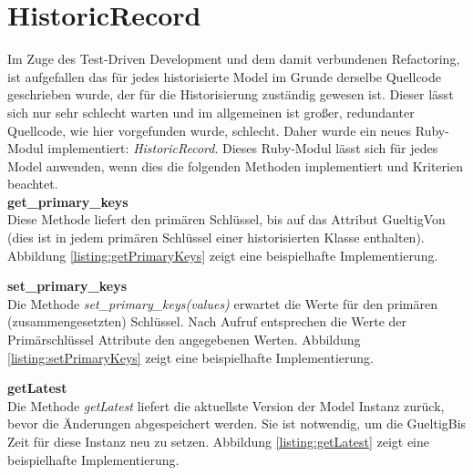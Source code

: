 \documentclass[12pt,             %
               a4paper,          %
               listof=totoc,     %
               index=totoc,      %
               bibliography=totoc,%
               oneside,         %
               BCOR1cm,          %
               english   %
               ]{scrbook}
\begin{document}
\section{HistoricRecord}
Im Zuge des Test-Driven Development und dem damit verbundenen Refactoring, ist aufgefallen das für jedes historisierte Model im Grunde derselbe Quellcode geschrieben wurde, der für die Historisierung zuständig gewesen ist. Dieser lässt sich nur sehr schlecht warten und im allgemeinen ist großer, redundanter Quellcode, wie hier vorgefunden wurde, schlecht. Daher wurde ein neues Ruby-Modul implementiert: \textit{HistoricRecord}. Dieses Ruby-Modul lässt sich für jedes Model anwenden, wenn dies die folgenden Methoden implementiert und Kriterien beachtet.\\

\textbf{get\_primary\_keys}\\
Diese Methode liefert den primären Schlüssel, bis auf das Attribut GueltigVon (dies ist in jedem primären Schlüssel einer historisierten Klasse enthalten). Abbildung \vref{listing:getPrimaryKeys} zeigt eine beispielhafte Implementierung.

\label{listing:getPrimaryKeys}

\textbf{set\_primary\_keys}\\
Die Methode \textit{set\_primary\_keys(values)} erwartet die Werte für den primären (zusammengesetzten) Schlüssel. Nach Aufruf entsprechen die Werte der Primärschlüssel Attribute den angegebenen Werten. Abbildung \vref{listing:setPrimaryKeys} zeigt eine beispielhafte Implementierung.

\label{listing:setPrimaryKeys}

\textbf{getLatest}\\
Die Methode \textit{getLatest} liefert die aktuellste Version der Model Instanz zurück, bevor die Änderungen abgespeichert werden. Sie ist notwendig, um die GueltigBis Zeit für diese Instanz neu zu setzen. Abbildung \vref{listing:getLatest} zeigt eine beispielhafte Implementierung.

\label{listing:getLatest}
\end{document}
